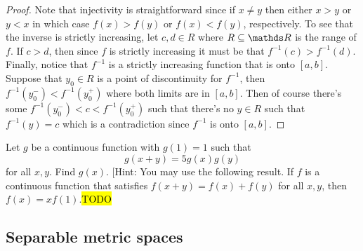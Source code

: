 \begin{proof}
Note that injectivity is straightforward since if $x\neq y$ then
either $x>y$ or $y<x$ in which case $f\left(x\right)>f\left(y\right)$
or $f\left(x\right)<f\left(y\right)$, respectively. To see that the
inverse is strictly increasing, let $c,d\in R$ where $R\subseteq\R$
is the range of $f$. If $c>d$, then since $f$ is strictly increasing
it must be that $f^{-1}\left(c\right)>f^{-1}\left(d\right)$. Finally,
notice that $f^{-1}$ is a strictly increasing function that is onto
$\left[a,b\right]$. Suppose that $y_{0}\in R$ is a point of discontinuity
for $f^{-1}$, then $f^{-1}\left(y_{0}^{-}\right)<f^{-1}\left(y_{0}^{+}\right)$
where both limits are in $\left[a,b\right].$ Then of course there's
some $f^{-1}\left(y_{0}^{-}\right)<c<f^{-1}\left(y_{0}^{+}\right)$
such that there's no $y\in R$ such that $f^{-1}\left(y\right)=c$
which is a contradiction since $f^{-1}$ is onto $\left[a,b\right].$
\end{proof}
\begin{example}
\label{exa:isi2008samplepsb3} Let $g$ be a continuous function with
$g(1)=1$ such that 
\[
g(x+y)=5g(x)g(y)
\]
 for all $x,y$. Find $g(x)$. {[}Hint: You may use the following
result. If $f$ is a continuous function that satisfies $f(x+y)=f(x)+f(y)$
for all $x,y$, then $f(x)=xf(1)$.\hl{TODO}
\end{example}


\subsection{Separable metric spaces}
